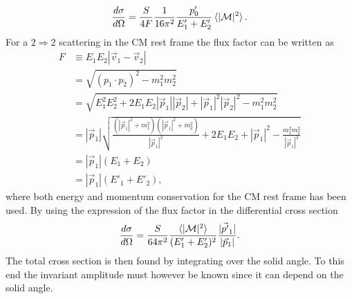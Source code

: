 \begin{equation}
	\frac{d\sigma}{d\Omega}=\frac{S}{4F}\frac{1}{16\pi^2}   \frac{p_0'}{E'_1+E'_2}\braket{|\mathcal{M}|^2}.
	\label{shiess}
\end{equation} 
For a $2\Rightarrow 2$ scattering in the CM rest frame the flux factor can be written as
\begin{equation}
	\begin{split}
		F&\equiv E_1E_2|\vec{v}_1-\vec{v}_2|\\
		&=\sqrt{(p_1\cdot p_2)^2-m_1^2m_2^2}\\
		&=\sqrt{E_1^2E_2^2+2E_1E_2|\vec{p}_1||\vec{p}_2|+|\vec{p}_1|^2|\vec{p}_2|^2-m_1^2m_2^2}\\
		&=|\vec{p}_1|\sqrt{\frac{(|\vec{p}_1|^2+m_1^2)(|\vec{p}_1|^2+m_2^2)}{|\vec{p}_1|^2}+2E_1E_2+|\vec{p}_1|^2-\frac{m_1^2m_2^2}{|\vec{p}_1|^2}}\\
		&=|\vec{p}_1|(E_1+E_2)\\
		&=|\vec{p}_1|(E'_1+E'_2),
	\end{split}
\end{equation} 
where both energy and momentum conservation for the CM rest frame has been used. By using the expression of the flux factor in the differential cross section
\begin{equation}
	\frac{d\sigma}{d\Omega}=\frac{S}{64\pi^2}   \frac{\braket{|\mathcal{M}|^2}}{(E'_1+E'_2)^2}\frac{|\vec{p'}_1|}{|\vec{p}_1|}.
	\label{diffcrossmass}
\end{equation} 
The total cross section is then found by integrating over the solid angle. To this end the invariant amplitude must however be known since it can depend on the solid angle.

